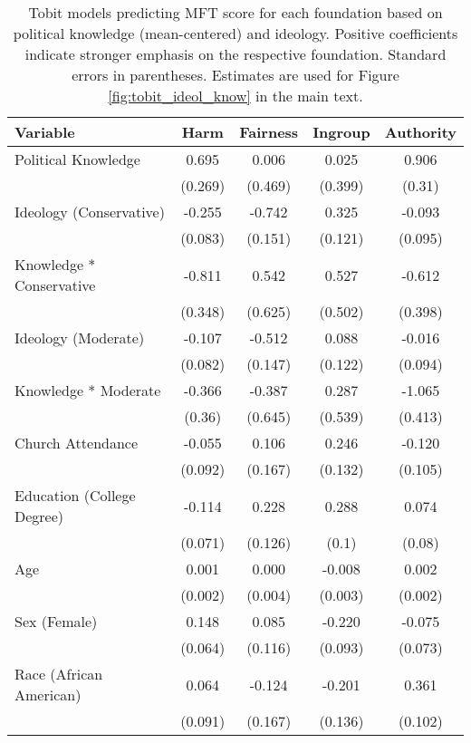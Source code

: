 \begin{table}[ht]
\centering
\caption{Tobit models predicting MFT score for each foundation based 
           on political knowledge (mean-centered) and ideology. Positive coefficients indicate stronger 
           emphasis on the respective foundation. Standard errors in parentheses. Estimates are used 
           for Figure \ref{fig:tobit_ideol_know} in the main text.} 
\label{tab:tobit_ideol_know}
\begingroup\footnotesize
\begin{tabular}{lcccc}
  \hline
Variable & Harm & Fairness & Ingroup & Authority \\ 
  \hline
Political Knowledge &  0.695 &  0.006 &  0.025 &  0.906 \\ 
   & (0.269) & (0.469) & (0.399) & (0.31) \\ 
  Ideology (Conservative) & -0.255 & -0.742 &  0.325 & -0.093 \\ 
   & (0.083) & (0.151) & (0.121) & (0.095) \\ 
  Knowledge * Conservative & -0.811 &  0.542 &  0.527 & -0.612 \\ 
   & (0.348) & (0.625) & (0.502) & (0.398) \\ 
  Ideology (Moderate) & -0.107 & -0.512 &  0.088 & -0.016 \\ 
   & (0.082) & (0.147) & (0.122) & (0.094) \\ 
  Knowledge * Moderate & -0.366 & -0.387 &  0.287 & -1.065 \\ 
   & (0.36) & (0.645) & (0.539) & (0.413) \\ 
  Church Attendance & -0.055 &  0.106 &  0.246 & -0.120 \\ 
   & (0.092) & (0.167) & (0.132) & (0.105) \\ 
  Education (College Degree) & -0.114 &  0.228 &  0.288 &  0.074 \\ 
   & (0.071) & (0.126) & (0.1) & (0.08) \\ 
  Age &  0.001 &  0.000 & -0.008 &  0.002 \\ 
   & (0.002) & (0.004) & (0.003) & (0.002) \\ 
  Sex (Female) &  0.148 &  0.085 & -0.220 & -0.075 \\ 
   & (0.064) & (0.116) & (0.093) & (0.073) \\ 
  Race (African American) &  0.064 & -0.124 & -0.201 &  0.361 \\ 
   & (0.091) & (0.167) & (0.136) & (0.102) \\ 

\end{tabular}
\end{table}

